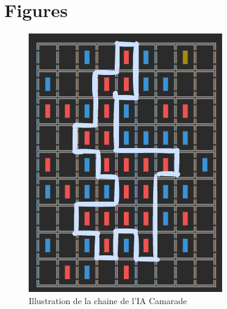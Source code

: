 \chapter{Figures}

\begin{figure}[h]
    \centering
    \includegraphics[width=\textwidth,angle=0]{./images/Camarade.png}
    \caption{Illustration de la chaine de l'IA Camarade}
    \label{fig:cam1}
\end{figure}

